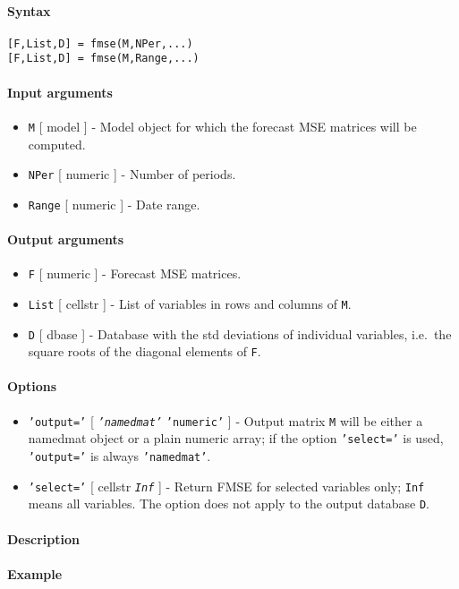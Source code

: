 


	\paragraph{Syntax}

\begin{verbatim}
[F,List,D] = fmse(M,NPer,...)
[F,List,D] = fmse(M,Range,...)
\end{verbatim}

\paragraph{Input arguments}

\begin{itemize}
\item
  \texttt{M} {[} model {]} - Model object for which the forecast MSE
  matrices will be computed.
\item
  \texttt{NPer} {[} numeric {]} - Number of periods.
\item
  \texttt{Range} {[} numeric {]} - Date range.
\end{itemize}

\paragraph{Output arguments}

\begin{itemize}
\item
  \texttt{F} {[} numeric {]} - Forecast MSE matrices.
\item
  \texttt{List} {[} cellstr {]} - List of variables in rows and columns
  of \texttt{M}.
\item
  \texttt{D} {[} dbase {]} - Database with the std deviations of
  individual variables, i.e.~the square roots of the diagonal elements
  of \texttt{F}.
\end{itemize}

\paragraph{Options}

\begin{itemize}
\item
  \texttt{'output='} {[} \emph{\texttt{'namedmat'}} \textbar{}
  \texttt{'numeric'} {]} - Output matrix \texttt{M} will be either a
  namedmat object or a plain numeric array; if the option
  \texttt{'select='} is used, \texttt{'output='} is always
  \texttt{'namedmat'}.
\item
  \texttt{'select='} {[} cellstr \textbar{} \emph{\texttt{Inf}} {]} -
  Return FMSE for selected variables only; \texttt{Inf} means all
  variables. The option does not apply to the output database
  \texttt{D}.
\end{itemize}

\paragraph{Description}

\paragraph{Example}


